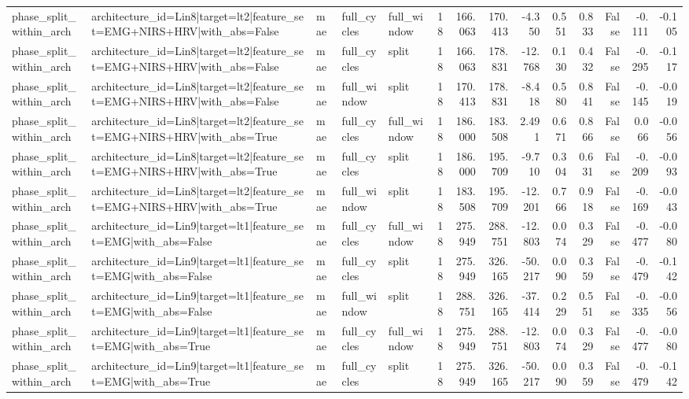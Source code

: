 \begin{table}
\begin{tabular}{lllllrrrrrrrrr}
phase_split_within_arch & architecture_id=Lin8|target=lt2|feature_set=EMG+NIRS+HRV|with_abs=False & mae & full_cycles & full_window & 18 & 166.063 & 170.413 & -4.350 & 0.551 & 0.833 & False & -0.111 & -0.105 \\
phase_split_within_arch & architecture_id=Lin8|target=lt2|feature_set=EMG+NIRS+HRV|with_abs=False & mae & full_cycles & split & 18 & 166.063 & 178.831 & -12.768 & 0.130 & 0.432 & False & -0.295 & -0.117 \\
phase_split_within_arch & architecture_id=Lin8|target=lt2|feature_set=EMG+NIRS+HRV|with_abs=False & mae & full_window & split & 18 & 170.413 & 178.831 & -8.418 & 0.580 & 0.841 & False & -0.145 & -0.019 \\
phase_split_within_arch & architecture_id=Lin8|target=lt2|feature_set=EMG+NIRS+HRV|with_abs=True & mae & full_cycles & full_window & 18 & 186.000 & 183.508 & 2.491 & 0.671 & 0.866 & False & 0.066 & -0.056 \\
phase_split_within_arch & architecture_id=Lin8|target=lt2|feature_set=EMG+NIRS+HRV|with_abs=True & mae & full_cycles & split & 18 & 186.000 & 195.709 & -9.710 & 0.304 & 0.631 & False & -0.209 & -0.093 \\
phase_split_within_arch & architecture_id=Lin8|target=lt2|feature_set=EMG+NIRS+HRV|with_abs=True & mae & full_window & split & 18 & 183.508 & 195.709 & -12.201 & 0.766 & 0.918 & False & -0.169 & -0.043 \\
phase_split_within_arch & architecture_id=Lin9|target=lt1|feature_set=EMG|with_abs=False & mae & full_cycles & full_window & 18 & 275.949 & 288.751 & -12.803 & 0.074 & 0.329 & False & -0.477 & -0.080 \\
phase_split_within_arch & architecture_id=Lin9|target=lt1|feature_set=EMG|with_abs=False & mae & full_cycles & split & 18 & 275.949 & 326.165 & -50.217 & 0.090 & 0.359 & False & -0.479 & -0.142 \\
phase_split_within_arch & architecture_id=Lin9|target=lt1|feature_set=EMG|with_abs=False & mae & full_window & split & 18 & 288.751 & 326.165 & -37.414 & 0.229 & 0.551 & False & -0.335 & -0.056 \\
phase_split_within_arch & architecture_id=Lin9|target=lt1|feature_set=EMG|with_abs=True & mae & full_cycles & full_window & 18 & 275.949 & 288.751 & -12.803 & 0.074 & 0.329 & False & -0.477 & -0.080 \\
phase_split_within_arch & architecture_id=Lin9|target=lt1|feature_set=EMG|with_abs=True & mae & full_cycles & split & 18 & 275.949 & 326.165 & -50.217 & 0.090 & 0.359 & False & -0.479 & -0.142 \\

\end{tabular}
\end{table}
